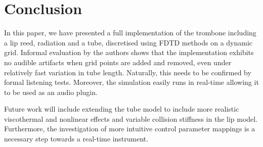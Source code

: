 \section{Conclusion}\label{sec:conclusion}
In this paper, we have presented a full implementation of the trombone including a lip reed, radiation and a tube, discretised using FDTD methods on a dynamic grid. Informal evaluation by the authors shows that the implementation exhibits no audible artifacts when grid points are added and removed, even under relatively fast variation in tube length. Naturally, this needs to be confirmed by formal listening tests. Moreover, the simulation easily runs in real-time allowing it to be used as an audio plugin. 

Future work will include extending the tube model to include more realistic viscothermal and nonlinear effects and variable collision stiffness in the lip model. Furthermore, the investigation of more intuitive control parameter mappings is a necessary step towards a real-time instrument.